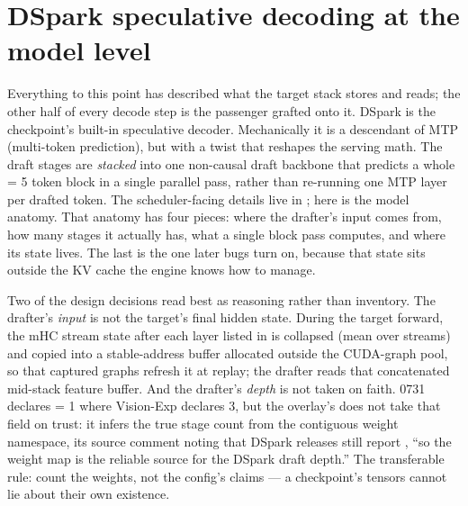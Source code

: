 \section{DSpark speculative decoding at the model level}
\label{sec:model-dspark}

Everything to this point has described what the target stack stores and
reads; the other half of every decode step is the passenger grafted onto
it. DSpark is the checkpoint's built-in speculative decoder. Mechanically it is a
descendant of MTP (multi-token prediction), but with a twist that reshapes the
serving math. The  draft stages are \emph{stacked} into one
non-causal draft backbone that predicts a whole  = 5
token block in a single parallel pass, rather than re-running one MTP layer
per drafted token. The scheduler-facing details live in ;
here is the model anatomy. That anatomy has four pieces: where the drafter's
input comes from, how many stages it actually has, what a single block pass
computes, and where its state lives. The last is the one later bugs turn on,
because that state sits outside the KV cache the engine knows how to manage.

Two of the design decisions read best as reasoning rather than inventory.
The drafter's \emph{input} is not the target's final hidden state. During
the target forward, the mHC stream state after each layer listed in
 is collapsed (mean over streams) and copied
into a stable-address buffer allocated outside the CUDA-graph pool, so that
captured graphs refresh it at replay; the drafter reads that concatenated
mid-stack feature buffer. And the drafter's \emph{depth} is not taken on
faith. 0731 declares  = 1 where Vision-Exp
declares 3, but the overlay's  does
not take that field on trust: it infers the true stage count from the
contiguous  weight namespace, its source comment noting that
DSpark releases still report , ``so the
weight map is the reliable source for the DSpark draft depth.'' The
transferable rule: count the
weights, not the config's claims --- a checkpoint's tensors cannot lie
about their own existence.

